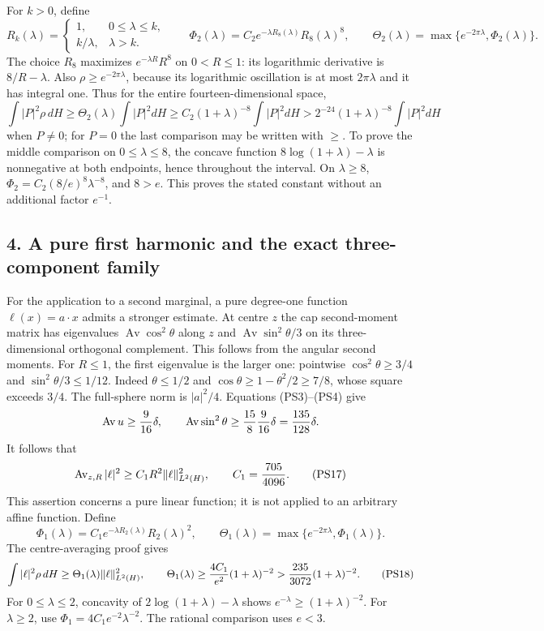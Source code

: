 \documentclass[11pt]{article}
\begin{document}
For \(k>0\), define
\[
 R_k(\lambda)=
 \begin{cases}1,&0\le\lambda\le k,\\ k/\lambda,&\lambda>k.\end{cases}
 \qquad
 \Phi_2(\lambda)=C_2e^{-\lambda R_8(\lambda)}R_8(\lambda)^8,
 \qquad
 \Theta_2(\lambda)=\max\{e^{-2\pi\lambda},\Phi_2(\lambda)\}.
 \tag{PS15}
\]
The choice \(R_8\) maximizes \(e^{-\lambda R}R^8\) on \(0<R\le1\):
its logarithmic derivative is \(8/R-\lambda\).
Also \(\rho\ge e^{-2\pi\lambda}\), because its logarithmic
oscillation is at most \(2\pi\lambda\) and it has integral one.
Thus for the entire fourteen-dimensional space,
\[
 \boxed{\int|P|^2\rho\,dH
       \ge\Theta_2(\lambda)\int|P|^2dH
       \ge C_2(1+\lambda)^{-8}\int|P|^2dH
       >2^{-24}(1+\lambda)^{-8}\int|P|^2dH}
 \tag{PS16}
\]
when \(P\ne0\); for \(P=0\) the last comparison may be written
with \(\ge\). To prove the middle comparison on \(0\le\lambda\le8\),
the concave function \(8\log(1+\lambda)-\lambda\) is nonnegative
at both endpoints, hence throughout the interval. On \(\lambda\ge8\),
\(\Phi_2=C_2(8/e)^8\lambda^{-8}\), and \(8>e\).
This proves the stated constant without an additional factor \(e^{-1}\).

\subsection*{4. A pure first harmonic and the exact three-component family}

For the application to a second marginal, a pure degree-one function
\(\ell(x)=a\cdot x\) admits a stronger estimate. At centre \(z\)
the cap second-moment matrix has eigenvalues
\(\operatorname{Av}\cos^2\theta\) along \(z\) and
\(\operatorname{Av}\sin^2\theta/3\) on its three-dimensional
orthogonal complement. This follows from the angular second moments.
For \(R\le1\), the first eigenvalue is the larger one: pointwise
\(\cos^2\theta\ge3/4\) and \(\sin^2\theta/3\le1/12\).
Indeed \(\theta\le1/2\) and
\(\cos\theta\ge1-\theta^2/2\ge7/8\), whose square exceeds \(3/4\).
The full-sphere norm is \(|a|^2/4\). Equations (PS3)–(PS4) give
\[
 \operatorname{Av}u\ge {9\over16}\delta,\qquad
 \operatorname{Av}\sin^2\theta
 \ge {15\over8}{9\over16}\delta={135\over128}\delta.
\]
It follows that
\[
 \operatorname{Av}_{z,R}|\ell|^2
 \ge C_1R^2\|\ell\|_{L^2(H)}^2,\qquad C_1={705\over4096}.
 \tag{PS17}
\]
This assertion concerns a pure linear function; it is not applied to
an arbitrary affine function.
Define
\[
 \Phi_1(\lambda)=C_1e^{-\lambda R_2(\lambda)}R_2(\lambda)^2,
 \qquad\Theta_1(\lambda)=\max\{e^{-2\pi\lambda},\Phi_1(\lambda)\}.
\]
The centre-averaging proof gives
\[
 \int|\ell|^2\rho\,dH\ge\Theta_1(\lambda)\|\ell\|_{L^2(H)}^2,
 \qquad
 \Theta_1(\lambda)\ge{4C_1\over e^2}(1+\lambda)^{-2}
 >{235\over3072}(1+\lambda)^{-2}.
 \tag{PS18}
\]
For \(0\le\lambda\le2\), concavity of
\(2\log(1+\lambda)-\lambda\) shows
\(e^{-\lambda}\ge(1+\lambda)^{-2}\).
For \(\lambda\ge2\), use
\(\Phi_1=4C_1e^{-2}\lambda^{-2}\).
The rational comparison uses \(e<3\).
\end{document}

